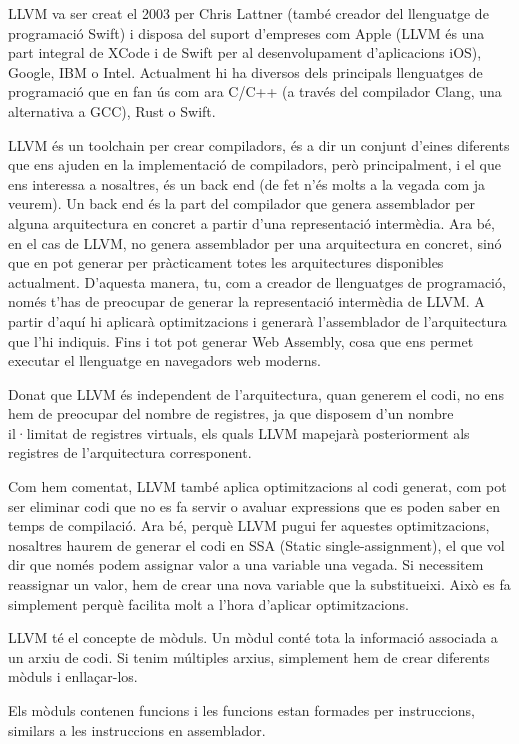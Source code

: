 ﻿\documentclass{article}
\begin{document}
LLVM va ser creat el 2003 per Chris Lattner (també creador del llenguatge de
programació Swift) i disposa del suport d'empreses com Apple (LLVM és una part
integral de XCode i de Swift per al desenvolupament d'aplicacions iOS), Google,
IBM o Intel. Actualment hi ha diversos dels principals llenguatges de
programació que en fan ús com ara C/C++ (a través del compilador Clang, una
alternativa a GCC), Rust o Swift.

LLVM és un toolchain per crear compiladors, és a dir un conjunt d'eines
diferents que ens ajuden en la implementació de compiladors, però principalment,
i el que ens interessa a nosaltres, és un back end (de fet n'és molts a la
vegada com ja veurem). Un back end és la part del compilador que genera
assemblador per alguna arquitectura en concret a partir d'una representació
intermèdia. Ara bé, en el cas de LLVM, no genera assemblador per una
arquitectura en concret, sinó que en pot generar per pràcticament totes les
arquitectures disponibles actualment. D'aquesta manera, tu, com a creador de
llenguatges de programació, només t'has de preocupar de generar la representació
intermèdia de LLVM. A partir d'aquí hi aplicarà optimitzacions i generarà
l'assemblador de l'arquitectura que l'hi indiquis. Fins i tot pot generar Web
Assembly, cosa que ens permet executar el llenguatge en navegadors web moderns.

Donat que LLVM és independent de l'arquitectura, quan generem el codi, no ens
hem de preocupar del nombre de registres, ja que disposem d'un nombre il·limitat
de registres virtuals, els quals LLVM mapejarà posteriorment als registres de
l'arquitectura corresponent.

Com hem comentat, LLVM també aplica optimitzacions al codi generat, com pot ser
eliminar codi que no es fa servir o avaluar expressions que es poden saber en
temps de compilació. Ara bé, perquè LLVM pugui fer aquestes optimitzacions, 
nosaltres haurem de generar el codi en SSA (Static single-assignment), el que vol
dir que només podem assignar valor a una variable una vegada. Si necessitem 
reassignar un valor, hem de crear una nova variable que la substitueixi. Això es
fa simplement perquè facilita molt a l'hora d'aplicar optimitzacions.

LLVM té el concepte de mòduls. Un mòdul conté tota la informació associada a un
arxiu de codi. Si tenim múltiples arxius, simplement hem de crear diferents 
mòduls i enllaçar-los.

Els mòduls contenen funcions i les funcions estan formades per instruccions, 
similars a les instruccions en assemblador.
\end{document}
